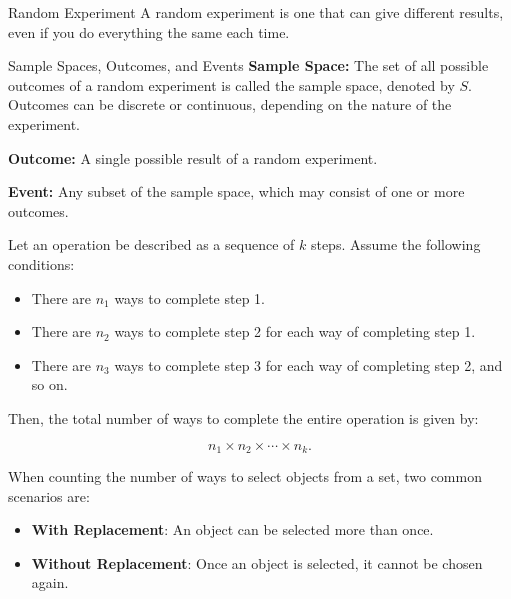 \begin{definition}{Random Experiment}
    A random experiment is one that can give different results, even if you do everything the same each time.
\end{definition}

\begin{definition}{Sample Spaces, Outcomes, and Events}
    \textbf{Sample Space:} The set of all possible outcomes of a random experiment is called the sample space, denoted by \( S \). Outcomes can be discrete or continuous, depending on the nature of the experiment.
    
    \textbf{Outcome:} A single possible result of a random experiment.
    
    \textbf{Event:} Any subset of the sample space, which may consist of one or more outcomes.
\end{definition}

\begin{theorem}
    Let an operation be described as a sequence of $k$ steps. Assume the following conditions:
    
    \begin{itemize}
        \item There are $n_1$ ways to complete step 1.
        \item There are $n_2$ ways to complete step 2 for each way of completing step 1.
        \item There are $n_3$ ways to complete step 3 for each way of completing step 2, and so on.
    \end{itemize}
    
    Then, the total number of ways to complete the entire operation is given by:
    
    \[
    n_1 \times n_2 \times \cdots \times n_k.
    \]
\end{theorem}

\begin{definition}
    When counting the number of ways to select objects from a set, two common scenarios are:

    \begin{itemize}
        \item \textbf{With Replacement}: An object can be selected more than once.
        \item \textbf{Without Replacement}: Once an object is selected, it cannot be chosen again.
    \end{itemize}
\end{definition}

